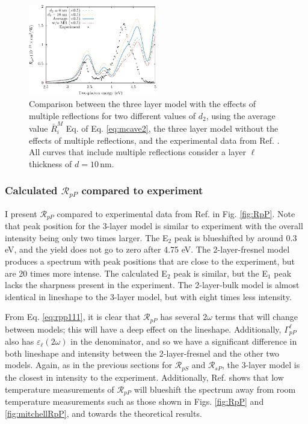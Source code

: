 \begin{figure}[H]
\centering
\includegraphics[width=0.5\textwidth]{content/figures/fig-Si1x1-MRdepth}
\caption{Comparison between the three layer model with the effects of multiple reflections for two different values of $d_{2}$, using the average value $\bar{R}^{M}_{i}$ Eq. of Eq. \eqref{eq:mcave2}, the three layer model without the effects of multiple reflections, and the experimental data from Ref. \cite{mejiaPRB02}. All curves that include multiple reflections consider a layer $\ell$ thickness of $d = 10\,\mathrm{nm}$.}
\label{fig:d2values}
\end{figure}


\subsubsection{Calculated \texorpdfstring{$\mathcal{R}_{pP}$}{RpP} compared to
experiment}

I present $\mathcal{R}_{pP}$ compared to experimental data from Ref. \cite{mejiaPRB02} in Fig. \ref{fig:RpP}. Note that peak position for the 3-layer model is similar to experiment with the overall intensity being only two times larger. The E$_{2}$ peak is blueshifted by around 0.3 eV, and the yield does not go to zero after 4.75 eV. The 2-layer-fresnel model produces a spectrum with peak positions that are close to the experiment, but are 20 times more intense. The calculated E$_{2}$ peak is similar, but the E$_{1}$ peak lacks the sharpness present in the experiment. The 2-layer-bulk model is almost identical in lineshape to the 3-layer model, but with eight times less intensity.

From Eq. \eqref{eq:rpp111}, it is clear that $\mathcal{R}_{pP}$ has several $2\omega$ terms that will change between models; this will have a deep effect on the lineshape. Additionally, $\Gamma^{\ell}_{pP}$ also has $\varepsilon_{\ell}(2\omega)$ in the denominator, and so we have a significant difference in both lineshape and intensity between the 2-layer-fresnel and the other two models. Again, as in the previous sections for $\mathcal{R}_{pS}$ and $\mathcal{R}_{sP}$, the 3-layer model is the closest in intensity to the experiment. Additionally, Ref. \cite{dadapPRB97} shows that low temperature measurements of $\mathcal{R}_{pP}$ will blueshift the spectrum away from room temperature measurements such as those shown in Figs. \ref{fig:RpP} and \ref{fig:mitchellRpP}, and towards the theoretical results.

